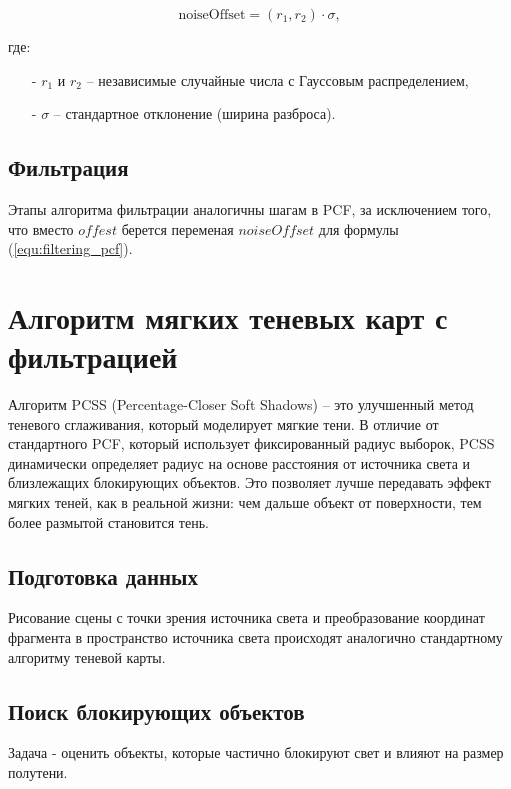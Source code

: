 \begin{equation}
    \label{equ:noise_offest}
    \text{noiseOffset} = (r_1, r_2) \cdot \sigma,
\end{equation}

\noindent где:

\begin{itemize}
    \item[-] $r_1$ и $r_2$ -- независимые случайные числа с Гауссовым распределением,
    \item[-] $\sigma$ -- стандартное отклонение (ширина разброса).
\end{itemize}

\subsection*{Фильтрация}

Этапы алгоритма фильтрации аналогичны шагам в PCF,
за исключением того, что вместо $offest$ берется
переменая $noiseOffset$ для формулы (\ref{equ:filtering_pcf}).

\section{Алгоритм мягких теневых карт с фильтрацией}

Алгоритм PCSS (Percentage-Closer Soft Shadows) --
это улучшенный метод теневого сглаживания,
который моделирует мягкие тени.
В отличие от стандартного PCF,
который использует фиксированный радиус выборок,
PCSS динамически определяет радиус на основе расстояния от источника света и
близлежащих блокирующих объектов.
Это позволяет лучше передавать эффект мягких теней,
как в реальной жизни: чем дальше объект от поверхности,
тем более размытой становится тень.

\subsection*{Подготовка данных}

Рисование сцены с точки зрения источника света и
преобразование координат фрагмента в пространство источника света
происходят аналогично стандартному алгоритму теневой карты.

\subsection*{Поиск блокирующих объектов}

Задача - оценить объекты, которые частично блокируют свет и влияют на размер полутени.


